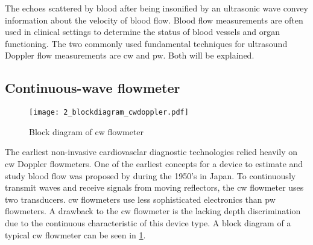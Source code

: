 The echoes scattered by blood after being insonified by an ultrasonic wave convey information about the velocity of blood flow. Blood flow measurements are often used in clinical settings to determine the status of blood vessels and organ functioning. The two commonly used fundamental techniques for ultrasound Doppler flow measurements are \gls{cw} and \gls{pw}. Both will be explained.

\subsection{Continuous-wave flowmeter}
\begin{figure}[ht]
	\centering
	\texttt{[image: 2\_blockdiagram\_cwdoppler.pdf]}
	\caption[Block diagram of continuous-wave flowmeter]{Block diagram of \gls{cw} flowmeter \cite{JensenUltrasoundBook}}
	\label{fig:2_devices_cw}
\end{figure}
The earliest non-invasive cardiovasclar diagnostic technologies relied heavily on \gls{cw} Doppler flowmeters. One of the earliest concepts for a device to estimate and study blood flow was proposed by \citeauthor{Satomura_CW}\cite{Satomura_CW} during the 1950's in Japan. To continuously transmit waves and receive signals from moving reflectors, the \gls{cw} flowmeter uses two transducers. \gls{cw} flowmeters use less sophisticated electronics than \gls{pw} flowmeters. A drawback to the \gls{cw} flowmeter is the lacking depth discrimination due to the continuous characteristic of this device type. A block diagram of a typical \gls{cw} flowmeter can be seen in \cref{fig:2_devices_cw}.

